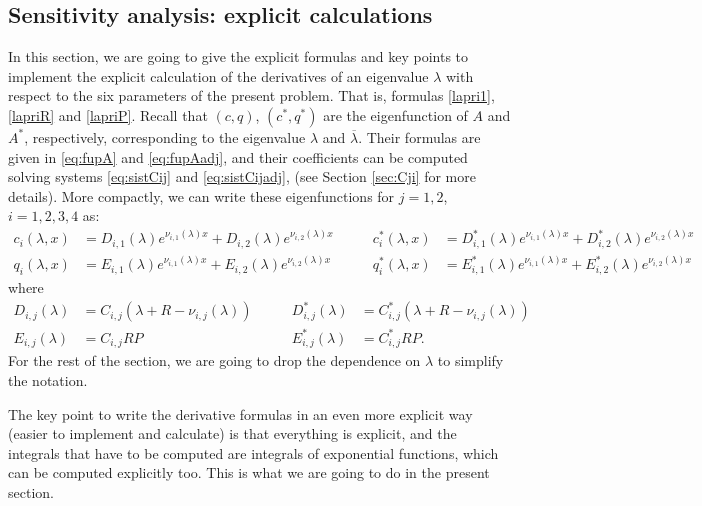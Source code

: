 \documentclass[a4paper]{article}
\newcommand{\X}[3]{#1_{#3,#2}}
\newcommand{\Xe}[3]{#1^*_{#3,#2}}
\numberwithin{equation}{section}
\begin{document}
\subsection{Sensitivity analysis: explicit calculations}\label{sec:derivcasestudy}
In this section, we are going to give the explicit formulas and key points to implement the explicit calculation of the derivatives of an eigenvalue $\lambda$ with respect to the six parameters of the present problem. That is, formulas \eqref{lapri1}, \eqref{lapriR} and \eqref{lapriP}. Recall that $(c,q)$, $(c^*,q^*)$ are the eigenfunction of $A$ and $A^*$, respectively, corresponding to the eigenvalue $\lambda$ and $\overline{\lambda}$. Their formulas are given in \eqref{eq:fupA} and \eqref{eq:fupAadj}, and their coefficients can be computed solving systems \eqref{eq:sistCij} and \eqref{eq:sistCijadj}, (see Section \ref{sec:Cji} for more details). More compactly, we can write these eigenfunctions for $j=1,2$, $i=1,2,3,4$ as:
\begin{align*}
c_i(\lambda,x) &= \X{D}{1}{i}(\lambda) e^{\X{\nu}{1}{i}(\lambda) x} + \X{D}{2}{i}(\lambda) e^{\X{\nu}{2}{i}(\lambda) x} \qquad &c_i^*(\lambda,x) &= \Xe{D}{1}{i}(\lambda) e^{\X{\nu}{1}{i}(\lambda) x} + \Xe{D}{2}{i}(\lambda) e^{\X{\nu}{2}{i}(\lambda) x}\\
q_i(\lambda,x) &= \X{E}{1}{i}(\lambda) e^{\X{\nu}{1}{i}(\lambda) x} + \X{E}{2}{i}(\lambda) e^{\X{\nu}{2}{i}(\lambda) x} \qquad &q_i^*(\lambda,x) &= \Xe{E}{1}{i}(\lambda) e^{\X{\nu}{1}{i}(\lambda) x} + \Xe{E}{2}{i}(\lambda) e^{\X{\nu}{2}{i}(\lambda) x}
\end{align*}
where
\begin{align*}
\X{D}{j}{i}(\lambda) &= \X{C}{j}{i} \left(\lambda+R-\X{\nu}{j}{i}(\lambda)\right) \qquad &\Xe{D}{j}{i}(\lambda) &= \Xe{C}{j}{i} \left(\lambda+R-\X{\nu}{j}{i}(\lambda)\right)\\
\X{E}{j}{i}(\lambda) &= \X{C}{j}{i} RP \qquad &\Xe{E}{j}{i}(\lambda) &= \Xe{C}{j}{i}RP.
\end{align*}
For the rest of the section, we are going to drop the dependence on $\lambda$ to simplify the notation.

The key point to write the derivative formulas in an even more explicit way (easier to implement and calculate) is that everything is explicit, and the integrals that have to be computed are integrals of exponential functions, which can be computed explicitly too. This is what we are going to do in the present section.
\end{document}
